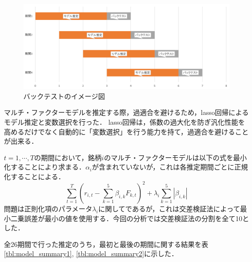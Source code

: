 ﻿\documentclass[a4paper]{jarticle}
\begin{document}
\begin{figure}[H]
	\begin{center}
		\includegraphics[width=15cm]{./fig/backtest.png}
		\caption{バックテストのイメージ図}
		\label{fig:backtest}
	\end{center}
\end{figure}


マルチ・ファクターモデルを推定する際，過適合を避けるため，lasso回帰によるモデル推定と変数選択を行った．
lasso回帰は，係数の過大化を防ぎ汎化性能を高めるだけでなく自動的に「変数選択」を行う能力を持て，過適合を避けることが出来る．

$t=1,\cdots,T$の期間において，銘柄$i$のマルチ・ファクターモデルは以下の式を最小化することにより求まる．$\alpha_i$が含まれていないが，これは各推定期間ごとに正規化することによる．
\begin{equation}
\sum_{t=1}^T\left(r_{i,t} - \sum_{k=1}^5\beta_{i,k}F_{k,t} \right)^2 + \lambda_i\sum_{k=1}^5|\beta_{i,k}|
\end{equation}
問題は正則化項のパラメータ$\lambda_i$に関してであるが，これは交差検証法によって最小二乗誤差が最小の値を使用する．今回の分析では交差検証法の分割を全て10とした．

全26期間で行った推定のうち，最初と最後の期間に関する結果を表\ref{tbl:model_summary1}, \ref{tbl:model_summary2}に示した．
\end{document}

